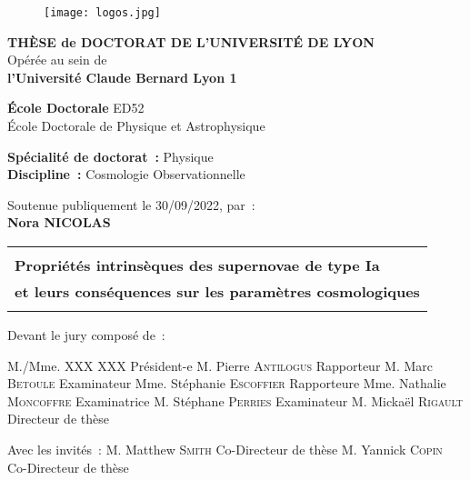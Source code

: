 \documentclass[../main/main.tex]{subfiles}
\begin{document}
\frontmatter

\begin{titlepage}
    \begin{center}
        \begin{figure}[h]
            \centering
            \texttt{[image: logos.jpg]}
        \end{figure}

        \vfill

        {\large\bfseries THÈSE de DOCTORAT DE L'UNIVERSITÉ DE LYON\\}
        {Opérée au sein de\\}
        {\large \bfseries l'Université Claude Bernard Lyon 1\\}
        \bigbreak

        {\large \textbf{École Doctorale} ED52\\
        École Doctorale de Physique et Astrophysique}
        \bigbreak

        {\large \textbf{Spécialité de doctorat~:} Physique \\}
        {\large \textbf{Discipline~:} Cosmologie Observationnelle}

        \vfill

        {Soutenue publiquement le 30/09/2022, par~:\\}
        {\Large\bfseries {Nora NICOLAS}\\}
        \vspace{0.5cm}
        \begin{adjustwidth}{-10pt}{-10pt}
        \begin{tabularx}{\linewidth}{Y}
            \toprule
            \\
            \Large \bfseries Propriétés intrinsèques des supernovae de type Ia\\
            \Large \bfseries et leurs conséquences sur les paramètres
            cosmologiques\\
            \\[-0.2em]
            \bottomrule
        \end{tabularx}
        \end{adjustwidth}

        \vfill

    \end{center}

\vfill

Devant le jury composé de~:\bigbreak

M./Mme. XXX XXX \hfill Président-e\smallbreak
M. Pierre \textsc{Antilogus} \hfill Rapporteur\smallbreak
M. Marc \textsc{Betoule} \hfill Examinateur\smallbreak
Mme. Stéphanie \textsc{Escoffier} \hfill Rapporteure\smallbreak
Mme. Nathalie \textsc{Moncoffre} \hfill Examinatrice\smallbreak
M. Stéphane \textsc{Perries} \hfill Examinateur\smallbreak
M. Mickaël \textsc{Rigault} \hfill Directeur de thèse\bigbreak

Avec les invités~:\bigbreak
M. Matthew \textsc{Smith} \hfill Co-Directeur de thèse\smallbreak
M. Yannick \textsc{Copin} \hfill Co-Directeur de thèse\smallbreak

\vfill

\end{titlepage}
\end{document}

